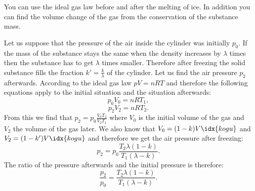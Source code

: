 {\ifEngHint
You can use the ideal gas law before and after the melting of ice. In addition you can find the volume change of the gas from the conservation of the substance mass.
\fi


\ifEngSolution
Let us suppose that the pressure of the air inside the cylinder was initially $p_{0}$. If the mass of the substance stays the same when the density increases by $\lambda$ times then the substance has to get $\lambda$ times smaller. Therefore after freezing the solid substance fills the fraction $k'=\frac{k}{\lambda}$ of the cylinder. Let us find the air pressure $p_{2}$ afterwards. According to the ideal gas law $pV=nRT$ and therefore the following equations apply to the initial situation and the situation afterwards:
\begin{equation*}
p_{0}V_{0}=nRT_{1},
\end{equation*} 
\begin{equation*}
p_{2}V_{2}=nRT_{2}.
\end{equation*}
From this we find that $p_{2}=p_{0}\frac{V_{0}T_{2}}{V_{2}T_{1}}$ where $V_{0}$ is the initial volume of the gas and $V_{2}$ the volume of the gas later. We also know that $V_{0}=(1-k)V\idx{kogu}$ and $V_{2}=(1-k')V\idx{kogu}$ and therefore we get the air pressure after freezing:
\begin{equation*}
p_{2}=p_{0}\frac{T_{2}\lambda (1-k)}{T_{1}(\lambda-k)}.
\end{equation*} 
The ratio of the pressure afterwards and the initial pressure is therefore:
\begin{equation*}
\frac{p_{2}}{p_{0}}=\frac{T_{2}\lambda(1-k)}{T_{1}(\lambda-k)}.
\end{equation*}
\fi
}